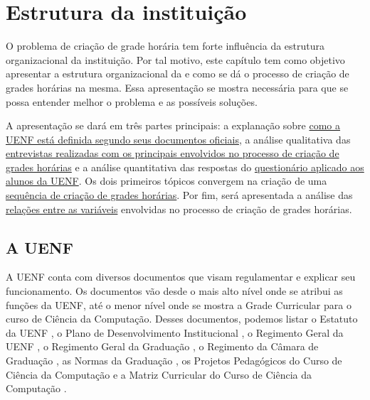 \chapter{Estrutura da instituição} \label{chap:instituicao} %

O problema de criação de grade horária tem forte influência da estrutura organizacional da instituição. Por tal motivo, este capítulo tem como objetivo apresentar a estrutura organizacional da  e como se dá o processo de criação de grades horárias na mesma. Essa apresentação se mostra necessária para que se possa entender melhor o problema e as possíveis soluções.

A apresentação se dará em três partes principais: a explanação sobre \hyperref[sec:estatuto]{como a UENF está definida segundo seus documentos oficiais}, a análise qualitativa das \hyperref[sec:entrevistas]{entrevistas realizadas com os principais envolvidos no processo de criação de grades horárias} e a análise quantitativa das respostas do \hyperref[sec:formulario]{questionário aplicado aos alunos da UENF}. Os dois primeiros tópicos convergem na criação de uma \hyperref[sec:sequencia]{sequência de criação de grades horárias}. Por fim, será apresentada a análise das \hyperref[sec:relacoes]{relações entre as variáveis} envolvidas no processo de criação de grades horárias.


\section{A UENF} \label{sec:estatuto} %

A UENF conta com diversos documentos que visam regulamentar e explicar seu funcionamento. Os documentos vão desde o mais alto nível onde se atribui as funções da UENF, até o menor nível onde se mostra a Grade Curricular para o curso de Ciência da Computação. Desses documentos, podemos listar o Estatuto da UENF \cite{Estatuto2002}, o Plano de Desenvolvimento Institucional \cite{PDI2023}, o Regimento Geral da UENF \cite{RegimentoGeralUENF2006}, o Regimento Geral da Graduação \cite{RegimentoGeralGraduação2012}, o Regimento da Câmara de Graduação \cite{RegimentoCâmaraGraduação2012}, as Normas da Graduação \cite{Normas2012}, os Projetos Pedagógicos do Curso de Ciência da Computação \cite{PPCCC2005, PPCCC2015, PPCCC2022} e a Matriz Curricular do Curso de Ciência da Computação \cite{Matriz2015}.

